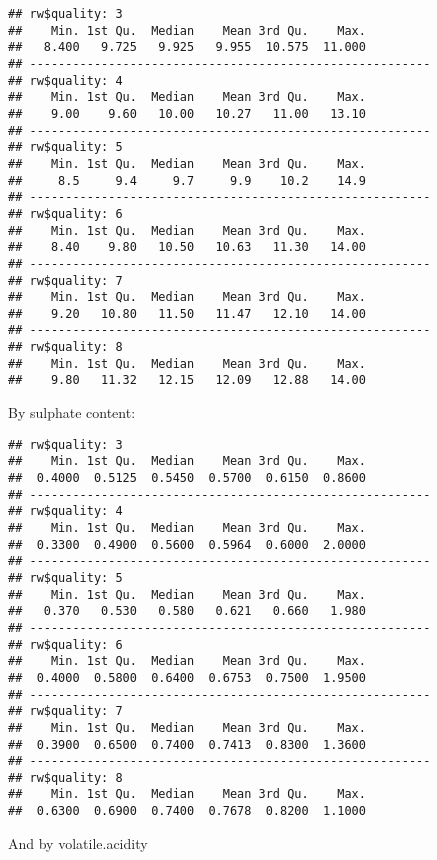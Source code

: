 \documentclass[]{article}
\begin{document}
\begin{verbatim}
## rw$quality: 3
##    Min. 1st Qu.  Median    Mean 3rd Qu.    Max. 
##   8.400   9.725   9.925   9.955  10.575  11.000 
## -------------------------------------------------------- 
## rw$quality: 4
##    Min. 1st Qu.  Median    Mean 3rd Qu.    Max. 
##    9.00    9.60   10.00   10.27   11.00   13.10 
## -------------------------------------------------------- 
## rw$quality: 5
##    Min. 1st Qu.  Median    Mean 3rd Qu.    Max. 
##     8.5     9.4     9.7     9.9    10.2    14.9 
## -------------------------------------------------------- 
## rw$quality: 6
##    Min. 1st Qu.  Median    Mean 3rd Qu.    Max. 
##    8.40    9.80   10.50   10.63   11.30   14.00 
## -------------------------------------------------------- 
## rw$quality: 7
##    Min. 1st Qu.  Median    Mean 3rd Qu.    Max. 
##    9.20   10.80   11.50   11.47   12.10   14.00 
## -------------------------------------------------------- 
## rw$quality: 8
##    Min. 1st Qu.  Median    Mean 3rd Qu.    Max. 
##    9.80   11.32   12.15   12.09   12.88   14.00
\end{verbatim}

By sulphate content:

\begin{verbatim}
## rw$quality: 3
##    Min. 1st Qu.  Median    Mean 3rd Qu.    Max. 
##  0.4000  0.5125  0.5450  0.5700  0.6150  0.8600 
## -------------------------------------------------------- 
## rw$quality: 4
##    Min. 1st Qu.  Median    Mean 3rd Qu.    Max. 
##  0.3300  0.4900  0.5600  0.5964  0.6000  2.0000 
## -------------------------------------------------------- 
## rw$quality: 5
##    Min. 1st Qu.  Median    Mean 3rd Qu.    Max. 
##   0.370   0.530   0.580   0.621   0.660   1.980 
## -------------------------------------------------------- 
## rw$quality: 6
##    Min. 1st Qu.  Median    Mean 3rd Qu.    Max. 
##  0.4000  0.5800  0.6400  0.6753  0.7500  1.9500 
## -------------------------------------------------------- 
## rw$quality: 7
##    Min. 1st Qu.  Median    Mean 3rd Qu.    Max. 
##  0.3900  0.6500  0.7400  0.7413  0.8300  1.3600 
## -------------------------------------------------------- 
## rw$quality: 8
##    Min. 1st Qu.  Median    Mean 3rd Qu.    Max. 
##  0.6300  0.6900  0.7400  0.7678  0.8200  1.1000
\end{verbatim}

And by volatile.acidity
\end{document}
